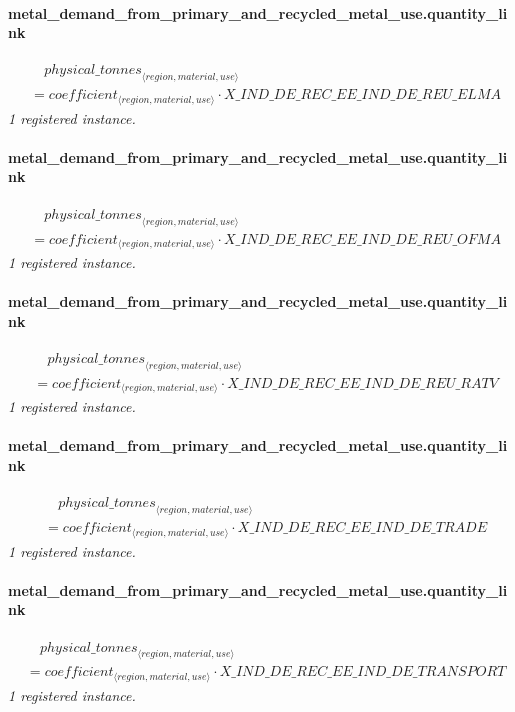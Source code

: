 \documentclass[11pt]{article}
\begin{document}
\paragraph{metal\_demand\_from\_primary\_and\_recycled\_metal\_use.quantity\_link}
\begin{align*}
&\quad {physical\_tonnes}_{\langle region, material, use\rangle}\\
&= coefficient_{\langle region, material, use\rangle} \cdot X\_IND\_DE\_REC\_EE\_IND\_DE\_REU\_ELMA
\end{align*}
\noindent\emph{1 registered instance.}\par
\paragraph{metal\_demand\_from\_primary\_and\_recycled\_metal\_use.quantity\_link}
\begin{align*}
&\quad {physical\_tonnes}_{\langle region, material, use\rangle}\\
&= coefficient_{\langle region, material, use\rangle} \cdot X\_IND\_DE\_REC\_EE\_IND\_DE\_REU\_OFMA
\end{align*}
\noindent\emph{1 registered instance.}\par
\paragraph{metal\_demand\_from\_primary\_and\_recycled\_metal\_use.quantity\_link}
\begin{align*}
&\quad {physical\_tonnes}_{\langle region, material, use\rangle}\\
&= coefficient_{\langle region, material, use\rangle} \cdot X\_IND\_DE\_REC\_EE\_IND\_DE\_REU\_RATV
\end{align*}
\noindent\emph{1 registered instance.}\par
\paragraph{metal\_demand\_from\_primary\_and\_recycled\_metal\_use.quantity\_link}
\begin{align*}
&\quad {physical\_tonnes}_{\langle region, material, use\rangle}\\
&= coefficient_{\langle region, material, use\rangle} \cdot X\_IND\_DE\_REC\_EE\_IND\_DE\_TRADE
\end{align*}
\noindent\emph{1 registered instance.}\par
\paragraph{metal\_demand\_from\_primary\_and\_recycled\_metal\_use.quantity\_link}
\begin{align*}
&\quad {physical\_tonnes}_{\langle region, material, use\rangle}\\
&= coefficient_{\langle region, material, use\rangle} \cdot X\_IND\_DE\_REC\_EE\_IND\_DE\_TRANSPORT
\end{align*}
\noindent\emph{1 registered instance.}\par
\end{document}
